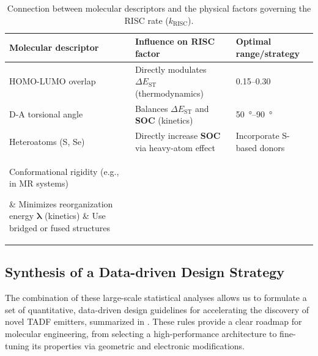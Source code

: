 \documentclass[journal=jcisd8,manuscript=article,keywords=true]{achemso}
\newcommand{\deltaest}{$\Delta E_{\text{ST}}$}
\begin{document}
{
\renewcommand{\arraystretch}{1.25}
\begin{table}[!ht]
\caption{Connection between molecular descriptors and the physical factors governing the RISC rate ($k_{\text{RISC}}$).}
\label{tab:risc_descriptors}
\small
\begin{tabularx}{\linewidth}{>{\raggedright\arraybackslash}m{}
>{\raggedright\arraybackslash}m{}
>{\raggedright\arraybackslash}m{}}
\toprule
\textbf{Molecular descriptor}                 & \textbf{Influence on RISC factor}
                    & \textbf{Optimal range/strategy} \\ \midrule
HOMO-LUMO overlap                             & Directly modulates \textbf{\deltaest}
(thermodynamics)         & \numrange{0.15}{0.30}           \\
D-A torsional angle                           & Balances \textbf{\deltaest} and
\textbf{SOC} (kinetics)        & \qtyrange{50}{90}{\degree}      \\
Heteroatoms (S, Se)                           & Directly increase \textbf{SOC} via
heavy-atom effect           & Incorporate S-based donors      \\
\parbox[c]{0.25\textwidth}{Conformational rigidity (e.g., in MR systems)} & Minimizes
reorganization energy $\mathbf{\lambda}$ (kinetics) & Use bridged or fused structures \\
\bottomrule
\end{tabularx}
\end{table}
}

\subsection{Synthesis of a Data-driven Design Strategy}

The combination of these large-scale statistical analyses allows us to formulate a set of quantitative, data-driven design guidelines for accelerating the discovery of novel TADF emitters, summarized in . These rules provide a clear roadmap for molecular engineering, from selecting a high-performance architecture to fine-tuning its properties via geometric and electronic modifications.
\end{document}
